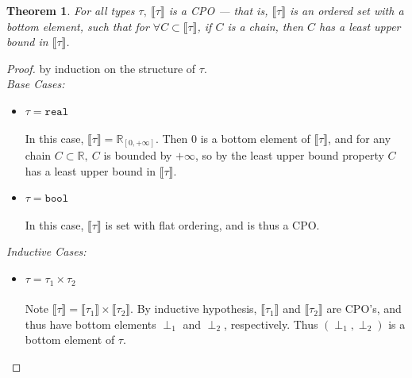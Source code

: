 \documentclass{westhesis}
\theoremstyle{plain}
\newtheorem{thm}{Theorem}
\theoremstyle{definition}
\newcommand{\R}{\mathbb{R}}
\begin{document}
\begin{thm}
For all types $\tau, \ \llbracket \tau \rrbracket$ is a CPO --- that is, $\llbracket \tau \rrbracket$ is an ordered 
set with a bottom element, such that for $\forall C \subset \llbracket \tau \rrbracket$, if  $C$ is a chain, then $C$ has a least 
upper bound in $\llbracket \tau \rrbracket$. \\
\end{thm}
\begin{proof}
by induction on the structure of $\tau$. \\
\emph{Base Cases: }
\begin{itemize}
\item $\tau = \texttt{real}$ \\ \\
In this case, $\llbracket \tau \rrbracket = \R_{[0,+\infty]}$. Then $0$ is a bottom element of $\llbracket \tau \rrbracket$, and for 
any chain $C \subset \R, \ C$ is bounded by $+\infty$, so by the least upper bound property $C$ has a least upper bound in 
$\llbracket \tau \rrbracket$.
\item $\tau = \texttt{bool}$ \\ \\
In this case, $\llbracket \tau \rrbracket$ is set with flat ordering, and is thus a CPO. \\ 
\end{itemize}
\emph{Inductive Cases: }
\begin{itemize}
\item $\tau = \tau_1 \times \tau_2$ \\ \\
Note $\llbracket \tau \rrbracket = \llbracket \tau_1 \rrbracket \times \llbracket \tau_2 \rrbracket$. By inductive hypothesis,
$\llbracket \tau_1 \rrbracket$ and $\llbracket \tau_2 \rrbracket$ are CPO's, and thus have bottom elements $\perp_1$ and $
\perp_2$, respectively. Thus $(\perp_1, \perp_2)$ is a bottom element of $\tau$. 


\end{itemize}
\end{proof}
\end{document}

